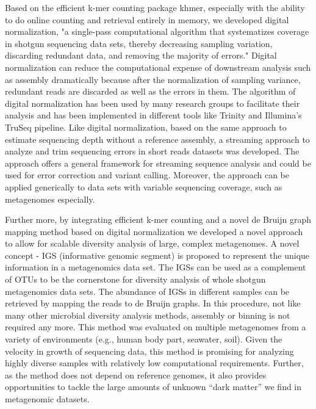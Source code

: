\documentclass{article}
\begin{document}
Based on the efficient k-mer counting package khmer, especially with the ability
to do online counting and retrieval entirely in memory, we developed digital
normalization\cite{Brown2012}, "a single-pass computational algorithm that systematizes
coverage in shotgun sequencing data sets, thereby decreasing sampling 
variation, discarding redundant data, and removing the majority of errors." 
Digital normalization can reduce the computational expense of downstream analysis
such as assembly dramatically because after the normalization of sampling variance,
redundant reads are discarded as well as the errors in 
them. The algorithm of digital
normalization has been used by many research groups to facilitate their
analysis and has been implemented in different tools like Trinity and 
Illumina's TruSeq pipeline. Like digital normalization, based on the same
approach to estimate sequencing depth without a reference assembly, a streaming
approach to analyze and trim sequencing errors in short reads datasets was
developed\cite{zhang2015crossing}. The approach offers a general framework for streaming sequence
analysis and could be used for error correction and variant calling. Moreover,
the approach can be applied generically to data sets with variable sequencing
coverage, such as metagenomes especially.

Further more, by integrating efficient k-mer counting and a novel de Bruijn
graph mapping method based on digital normalization we developed a novel
approach to allow for scalable diversity analysis of large, complex
metagenomes. A novel concept - IGS (informative genomic segment) is proposed
to represent the unique information in a metagenomics data set. The IGSs can be
used as a complement of OTUs to be the cornerstone for diversity analysis of
whole shotgun metagenomics data sets. The abundance of IGSs in different
samples can be retrieved by mapping the reads to de Bruijn graphs. In this
procedure, not like many other microbial diversity analysis methods, assembly or
binning is not required any more. This method was evaluated on multiple
metagenomes from a variety of environments (e.g., human body part, seawater,
soil). Given the velocity in growth of sequencing data, this method is
promising for analyzing highly diverse samples with relatively low
computational requirements. Further, as the method does not depend on reference
genomes, it also provides opportunities to tackle the large amounts of unknown
``dark matter'' we find in metagenomic datasets.
\end{document}
